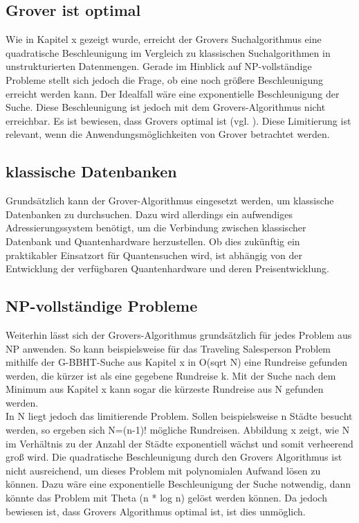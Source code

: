 \subsection{Grover ist optimal}
Wie in Kapitel x gezeigt wurde, erreicht der Grovers Suchalgorithmus eine quadratische Beschleunigung im Vergleich zu klassischen Suchalgorithmen in unstrukturierten Datenmengen. 
Gerade im Hinblick auf NP-vollständige Probleme stellt sich jedoch die Frage, ob eine noch größere Beschleunigung erreicht werden kann. Der Idealfall wäre eine exponentielle Beschleunigung der Suche. 
Diese Beschleunigung ist jedoch mit dem Grovers-Algorithmus nicht erreichbar. 
Es ist bewiesen, dass Grovers optimal ist (vgl. ). 
Diese Limitierung ist relevant, wenn die Anwendungsmöglichkeiten von Grover betrachtet werden.
\subsection{klassische Datenbanken}
Grundsätzlich kann der Grover-Algorithmus eingesetzt werden, um klassische Datenbanken zu durchsuchen. 
Dazu wird allerdings ein aufwendiges Adressierungssystem benötigt, um die Verbindung zwischen klassischer Datenbank und Quantenhardware herzustellen. 
Ob dies zukünftig ein praktikabler Einsatzort für Quantensuchen wird, ist abhängig von der Entwicklung der verfügbaren Quantenhardware und deren Preisentwicklung.
\subsection{NP-vollständige Probleme}
Weiterhin lässt sich der Grovers-Algorithmus grundsätzlich für jedes Problem aus NP anwenden. So kann beispielsweise für das Traveling Salesperson Problem mithilfe der G-BBHT-Suche aus Kapitel x in O(sqrt N) eine Rundreise gefunden werden, die kürzer ist als eine gegebene Rundreise k. 
Mit der Suche nach dem Minimum aus Kapitel x kann sogar die kürzeste Rundreise aus N gefunden werden.
\\
In N liegt jedoch das limitierende Problem. Sollen beispielsweise n Städte besucht werden, so ergeben sich N=(n-1)! mögliche Rundreisen. Abbildung x zeigt, wie N im Verhältnis zu der Anzahl der Städte exponentiell wächst und somit verheerend groß wird. 
Die quadratische Beschleunigung durch den Grovers Algorithmus ist nicht ausreichend, um dieses Problem mit polynomialen Aufwand lösen zu können. 
Dazu wäre eine exponentielle Beschleunigung der Suche notwendig, dann könnte das Problem mit Theta (n * log n) gelöst werden können. 
Da jedoch bewiesen ist, dass Grovers Algorithmus optimal ist, ist dies unmöglich.
